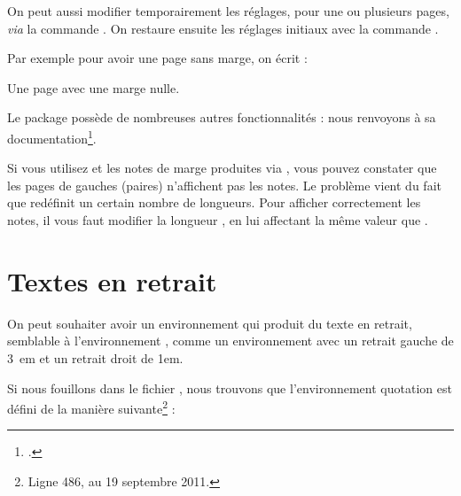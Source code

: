 On peut aussi modifier temporairement les réglages, pour une ou plusieurs pages, \emph{via} la commande . On restaure ensuite les réglages initiaux  avec la commande .

Par exemple pour avoir une page sans marge, on écrit :

\begin{latexcode}
Une page avec une marge nulle.
\newpage
\restoregeometry
\end{latexcode}

Le package  possède de nombreuses autres fonctionnalités : nous renvoyons à sa documentation\footcite{geometry}.

\begin{attention}
Si vous utilisez  et les notes de marge produites via , vous pouvez constater que les pages de gauches (paires) n'affichent pas les notes. Le problème vient du fait que  redéfinit un certain nombre de longueurs. Pour afficher correctement les notes, il vous faut modifier la longueur , en lui affectant la même valeur que .

\begin{latexcode}
\setlength{\marginparwidth}{\leftmargin}
\end{latexcode}
\end{attention}

\section{Textes en retrait}

On peut souhaiter avoir un environnement qui produit du texte en retrait, semblable à l'environnement , comme un environnement  avec un retrait gauche de 3~em et un retrait droit de 1em.

Si nous fouillons dans le fichier , nous trouvons que l'environnement quotation est défini de la manière suivante\footnote{Ligne 486, au 19 septembre 2011.} :

\begin{latexcode}
\newenvironment{quotation}
               {\list{}{\listparindent 1.5em %
                        \itemindent    \listparindent
                        \rightmargin   \leftmargin
                        \parsep        \z@ \@plus\p@}%
                \item\relax}
               {\endlist}
\end{latexcode}


